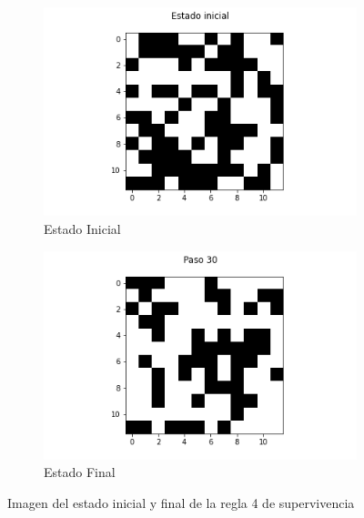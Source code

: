 \documentclass{article}
\begin{document}
\begin{figure}[H]
\centering
\begin{subfigure}[b]{0.45\linewidth}
\includegraphics[width=\linewidth]{p2_r4_t00_p.png}
\caption{Estado Inicial}
\end{subfigure}
\begin{subfigure}[b]{0.45\linewidth}
\includegraphics[width=\linewidth]{p2_r4_t30_p.png}
\caption{Estado Final}
\end{subfigure}
\caption{Imagen del estado inicial y final de la regla 4 de supervivencia}
\label{fig:westminster}
\end{figure}
\end{document}
